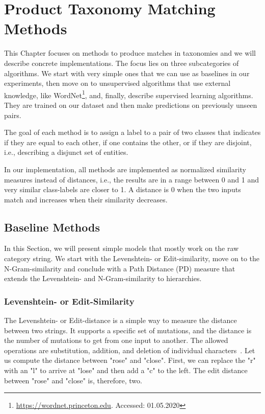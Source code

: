 \chapter{Product Taxonomy Matching Methods}
\label{ch:taxonomy-matching}

This Chapter focuses on methods to produce matches in taxonomies and we will describe concrete implementations.
The focus lies on three subcategories of algorithms.
We start with very simple ones that we can use as baselines in our experiments, then move on to
unsupervised algorithms that use external knowledge, like WordNet\footnote{\url{https://wordnet.princeton.edu}. Accessed: 01.05.2020},
and, finally, describe supervised learning algorithms.
They are trained on our dataset and then make predictions on previously unseen pairs.

The goal of each method is to assign a label to a pair of two classes that indicates if they are
equal to each other, if one contains the other, or if they are disjoint, i.e., describing a disjunct set
of entities.

In our implementation, all methods are implemented as normalized similarity measures instead of distances, i.e.,
the results are in a range between 0 and 1 and very similar class-labels are closer to 1.
A distance is 0 when the two inputs match and increases when their similarity decreases.

\section{Baseline Methods}
\label{sec:baseline}

In this Section, we will present simple models that mostly work on the raw category string.
We start with the Levenshtein- or Edit-similarity, move on to the N-Gram-similarity and conclude with
a Path Distance (PD) measure that extends the Levenshtein- and N-Gram-similarity to hierarchies.

\subsection{Levenshtein- or Edit-Similarity}
\label{subsec:levenshtein}

The Levenshtein- or Edit-distance is a simple way to measure the distance between two strings.
It supports a specific set of mutations, and the distance is the number of mutations to get from one
input to another.
The allowed operations are substitution, addition, and deletion of individual characters~\cite{levenshtein1966binary}.
Let us compute the distance between "rose" and "close".
First, we can replace the "r" with an "l" to arrive at "lose" and then add a "c" to the left.
The edit distance between "rose" and "close" is, therefore, two.

